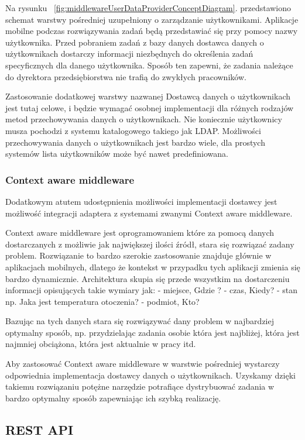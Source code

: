 Na rysunku ~\ref{fig:middlewareUserDataProviderConceptDiagram}. przedstawiono schemat warstwy pośredniej uzupełniony o zarządzanie użytkownikami. Aplikacje mobilne podczas rozwiązywania zadań będą przedstawiać się przy pomocy nazwy użytkownika. Przed pobraniem zadań z bazy danych dostawca danych o użytkownikach dostarczy informacji niezbędnych do określenia zadań specyficznych dla danego użytkownika. Sposób ten zapewni, że zadania należące do dyrektora przedsiębiorstwa nie trafią do zwykłych pracowników. 

Zastosowanie dodatkowej warstwy nazwanej Dostawcą danych o użytkownikach jest tutaj celowe, i będzie wymagać osobnej implementacji dla różnych rodzajów metod przechowywania danych o użytkownikach. Nie koniecznie użytkownicy musza pochodzi z systemu katalogowego takiego jak LDAP. Możliwości przechowywania danych o użytkownikach jest bardzo wiele, dla prostych systemów lista użytkowników może być nawet predefiniowana.

\subsubsection{Context aware middleware}
Dodatkowym atutem udostępnienia możliwości implementacji dostawcy jest możliwość integracji adaptera z systemami zwanymi Context aware middleware. 

Context aware middleware jest oprogramowaniem które za pomocą danych dostarczanych z możliwie jak największej ilości źródł, stara się rozwiązać zadany problem. Rozwiązanie to bardzo szerokie zastosowanie znajduje głównie w aplikacjach mobilnych, dlatego że kontekst w przypadku tych aplikacji zmienia się bardzo dynamicznie. Architektura skupia się przede wszystkim na dostarczeniu informacji opisujących takie wymiary jak: - miejsce, Gdzie ? - czas, Kiedy? - stan np. Jaka jest temperatura otoczenia? - podmiot, Kto?

Bazując na tych danych stara się rozwiązywać dany problem w najbardziej optymalny sposób, np. przydzielając zadania osobie która jest najbliżej, która jest najmniej obciążona, która jest aktualnie w pracy itd.

Aby zastosować Context aware middleware w warstwie pośredniej wystarczy odpowiednia implementacja dostawcy danych o użytkownikach. Uzyskamy dzięki takiemu rozwiązaniu potężne narzędzie potrafiące dystrybuować zadania w bardzo optymalny sposób zapewniając ich szybką realizację.  

\subsection{REST API}

